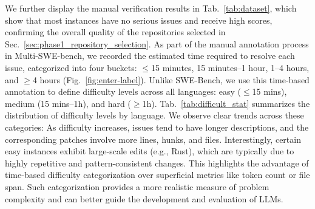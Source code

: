 \documentclass[11pt, a4paper, logo, copyright, nonumbering]{seed}
\newcommand{\multiswebench}{Multi-SWE-bench\xspace}
\begin{document}
We further display the manual verification results in Tab.~\ref{tab:dataset}, which show that most instances have no serious issues and receive high scores, confirming the overall quality of the repositories selected in Sec.~\ref{sec:phase1_repository_selection}.
As part of the manual annotation process in \multiswebench, we recorded the estimated time required to resolve each issue, categorized into four buckets: $\leq$15 minutes, 15 minutes–1 hour, 1–4 hours, and $\geq$4 hours (Fig.~\ref{fig:enter-label}). 
Unlike SWE-Bench, we use this time-based annotation to define difficulty levels across all languages: easy ($\leq$15 mins), medium (15 mins–1h), and hard ($\geq$1h). 
Tab.~\ref{tab:difficult_stat} summarizes the distribution of difficulty levels by language. 
We observe clear trends across these categories: 
As difficulty increases, issues tend to have longer descriptions, and the corresponding patches involve more lines, hunks, and files. 
Interestingly, certain easy instances exhibit large-scale edits (e.g., Rust), which are typically due to highly repetitive and pattern-consistent changes. 
This highlights the advantage of time-based difficulty categorization over superficial metrics like token count or file span. 
Such categorization provides a more realistic measure of problem complexity and can better guide the development and evaluation of LLMs.
\end{document}
